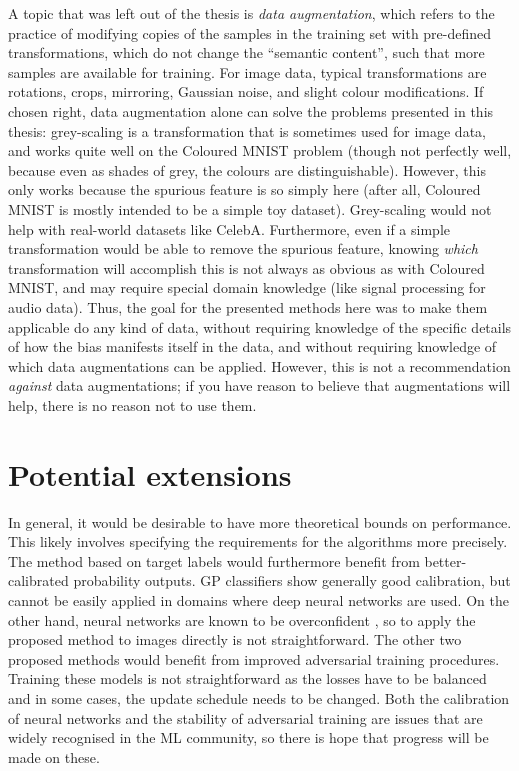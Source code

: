 A topic that was left out of the thesis is \emph{data augmentation},
which refers to the practice of modifying copies of the samples in the training set
with pre-defined transformations, which do not change the ``semantic content'',
such that more samples are available for training.
For image data, typical transformations are rotations, crops, mirroring, Gaussian noise, and slight colour modifications.
If chosen right, data augmentation alone can solve the problems presented in this thesis:
grey-scaling is a transformation that is sometimes used for image data,
and works quite well on the Coloured MNIST problem
(though not perfectly well, because even as shades of grey, the colours are distinguishable).
However, this only works because the spurious feature is so simply here
(after all, Coloured MNIST is mostly intended to be a simple toy dataset).
Grey-scaling would not help with real-world datasets like CelebA.
Furthermore, even if a simple transformation would be able to remove the spurious feature,
knowing \emph{which} transformation will accomplish this is not always as obvious as with Coloured MNIST,
and may require special domain knowledge (like signal processing for audio data).
Thus, the goal for the presented methods here was to make them applicable do any kind of data,
without requiring knowledge of the specific details of how the bias manifests itself in the data,
and without requiring knowledge of which data augmentations can be applied.
However, this is not a recommendation \emph{against} data augmentations;
if you have reason to believe that augmentations will help,
there is no reason not to use them.

\section{Potential extensions}\label{sec:potential-extentions}
%
In general, it would be desirable to have more theoretical bounds on performance.
This likely involves specifying the requirements for the algorithms more precisely.
The method based on target labels would furthermore benefit from better-calibrated probability outputs.
\acf{GP} classifiers show generally good calibration,
but cannot be easily applied in domains where deep neural networks are used.
On the other hand, neural networks are known to be overconfident
\citep[especially when using ReLU activations;][]{hein2019relu},
so to apply the proposed method to images directly is not straightforward.
The other two proposed methods would benefit from improved adversarial training procedures.
Training these models is not straightforward as the losses have to be balanced
and in some cases, the update schedule needs to be changed.
Both the calibration of neural networks and the stability of adversarial training
are issues that are widely recognised in the \ac{ML} community,
so there is hope that progress will be made on these.

